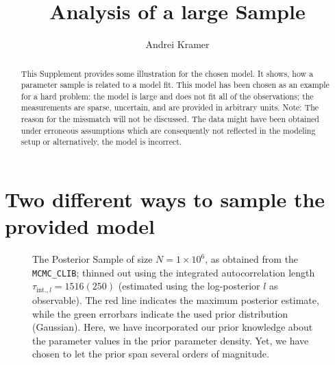 \documentclass[english]{scrartcl}
\author{Andrei Kramer}
\title{Analysis of a large Sample}
\begin{document}
\maketitle
\begin{abstract}
  This Supplement provides some illustration for the chosen model. It
  shows, how a parameter sample is related to a model fit. This model
  has been chosen as an example for a hard problem: the model is large
  and does not fit all of the observations; the measurements are
  sparse, uncertain, and are provided in arbitrary units. Note: The
  reason for the missmatch will not be discussed. The data might have
  been obtained under erroneous assumptions which are consequently not
  reflected in the modeling setup or alternatively, the model is
  incorrect.
\end{abstract}
\section{Two different ways to sample the provided model}

\begin{figure}
  \hspace*{-1cm}
  
  \caption{The Posterior Sample of size $N=1\times10^6$, as obtained
    from the \texttt{MCMC\_CLIB}; thinned out using the integrated
    autocorrelation length $\tau_{\text{int.},l}=1516(250)$ (estimated
    using the log-posterior $l$ as observable). The red line indicates
    the maximum posterior estimate, while the green errorbars indicate
    the used prior distribution (Gaussian). Here, we have incorporated
    our prior knowledge about the parameter values in the prior
    parameter density. Yet, we have chosen to let the prior span
    several orders of magnitude.\label{fig:pc-sample}}
\end{figure}
\end{document}
